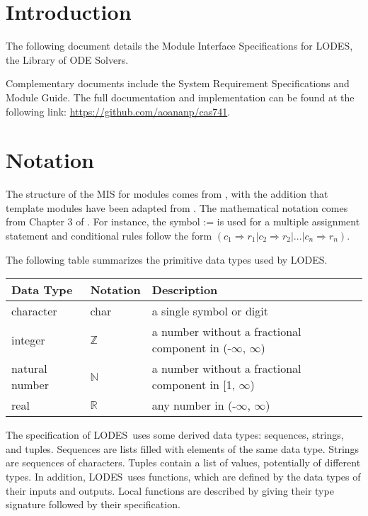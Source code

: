 \documentclass[12pt, titlepage]{article}
\newcommand{\progname}{LODES}
\newcommand{\progdesc}{Library of ODE Solvers}
\begin{document}
\section{Introduction}

The following document details the Module Interface Specifications for
\progname{}, the \progdesc{}.

Complementary documents include the System Requirement Specifications
and Module Guide.  The full documentation and implementation can be
found at the following link: \url{https://github.com/aoananp/cas741}. 


\section{Notation}


The structure of the MIS for modules comes from \citet{HoffmanAndStrooper1995},
with the addition that template modules have been adapted from
\cite{GhezziEtAl2003}.  The mathematical notation comes from Chapter 3 of
\citet{HoffmanAndStrooper1995}.  For instance, the symbol := is used for a
multiple assignment statement and conditional rules follow the form $(c_1
\Rightarrow r_1 | c_2 \Rightarrow r_2 | ... | c_n \Rightarrow r_n )$.

The following table summarizes the primitive data types used by \progname. 

\begin{center}
\renewcommand{\arraystretch}{1.2}
\noindent 
\begin{tabular}{l l p{7.5cm}} 
\toprule 
\textbf{Data Type} & \textbf{Notation} & \textbf{Description}\\ 
\midrule
character & char & a single symbol or digit\\
integer & $\mathbb{Z}$ & a number without a fractional component in (-$\infty$, $\infty$) \\
natural number & $\mathbb{N}$ & a number without a fractional component in [1, $\infty$) \\
real & $\mathbb{R}$ & any number in (-$\infty$, $\infty$)\\
\bottomrule
\end{tabular} 
\end{center}

\noindent
The specification of \progname \ uses some derived data types: sequences, strings, and
tuples. Sequences are lists filled with elements of the same data type. Strings
are sequences of characters. Tuples contain a list of values, potentially of
different types. In addition, \progname \ uses functions, which
are defined by the data types of their inputs and outputs. Local functions are
described by giving their type signature followed by their specification.
\end{document}
